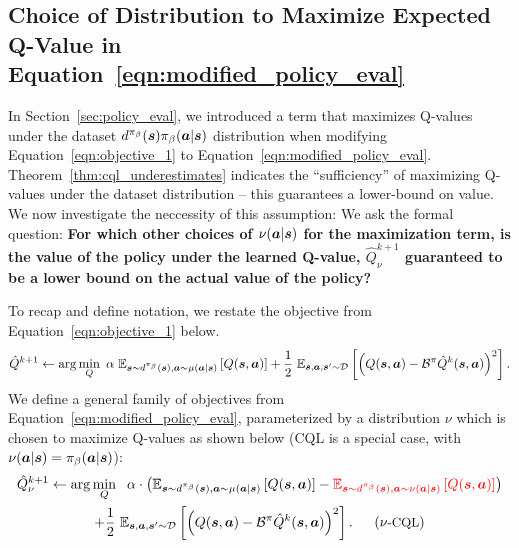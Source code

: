 \subsection{Choice of Distribution to Maximize Expected Q-Value in Equation~\ref{eqn:modified_policy_eval}}
\label{app:maximizing_distributions}

In Section~\ref{sec:policy_eval}, we introduced a term that maximizes Q-values under the dataset $d^{\pi_\beta}(\boldsymbol{s}) {\pi_\beta}(\boldsymbol{a}|\boldsymbol{s})$ distribution when modifying Equation~\ref{eqn:objective_1} to Equation~\ref{eqn:modified_policy_eval}. Theorem~\ref{thm:cql_underestimates} indicates the ``sufficiency'' of maximizing Q-values under the dataset distribution -- this guarantees a lower-bound on value. We now investigate the neccessity of this assumption: We ask the formal question: \textbf{For which other choices of $\nu(\boldsymbol{a}|\boldsymbol{s})$ for the maximization term, is the value of the policy under the learned Q-value, $\hat{Q}^{k+1}_\nu$ guaranteed to be a lower bound on the actual value of the policy?}

To recap and define notation, we restate the objective from Equation~\ref{eqn:objective_1} below.  
\begin{equation}
    \small{\hat{Q}^{k+1} \leftarrow \arg\min_{Q}~ \alpha~ \mathbb{E}_{\boldsymbol{s}\sim d^{\pi_\beta}(\boldsymbol{s}), \boldsymbol{a} \sim \mu(\boldsymbol{a}|\boldsymbol{s})}\left[Q(\boldsymbol{s}, \boldsymbol{a})\right] + \frac{1}{2}~ \mathbb{E}_{\boldsymbol{s}, \boldsymbol{a}, \boldsymbol{s}' \sim \mathcal{D}}\left[\left(Q(\boldsymbol{s}, \boldsymbol{a}) - \mathcal{B}^\pi\hat{Q}^{k} (\boldsymbol{s}, \boldsymbol{a}) \right)^2 \right].} 
    \label{eqn:objective_1_restated}
\end{equation}
We define a general family of objectives from Equation~\ref{eqn:modified_policy_eval}, parameterized by a distribution $\nu$ which is chosen to maximize Q-values as shown below (CQL is a special case, with $\nu(\boldsymbol{a}|\boldsymbol{s}) = {\pi_\beta}(\boldsymbol{a}|\boldsymbol{s})$):
\begin{multline}
    \small{\hat{Q}^{k+1}_\nu \leftarrow \arg\min_{Q}~~ \alpha \cdot \left(\mathbb{E}_{\boldsymbol{s}\sim d^{\pi_\beta}(\boldsymbol{s}), \boldsymbol{a} \sim \mu(\boldsymbol{a}|\boldsymbol{s})}\left[Q(\boldsymbol{s}, \boldsymbol{a})\right] - \textcolor{red}{\mathbb{E}_{\boldsymbol{s}\sim d^{\pi_\beta}(\boldsymbol{s}), \boldsymbol{a} \sim \nu(\boldsymbol{a}|\boldsymbol{s})}\left[Q(\boldsymbol{s}, \boldsymbol{a})\right]} \right)} \\
    \small{+ \frac{1}{2}~ \mathbb{E}_{\boldsymbol{s}, \boldsymbol{a}, \boldsymbol{s}' \sim \mathcal{D}}\left[\left(Q(\boldsymbol{s}, \boldsymbol{a}) - \mathcal{B}^\pi\hat{Q}^{k} (\boldsymbol{s}, \boldsymbol{a}) \right)^2 \right].~~~~~ (\nu\text{-CQL})}
    \label{eqn:modified_policy_eval_new}
\end{multline}

